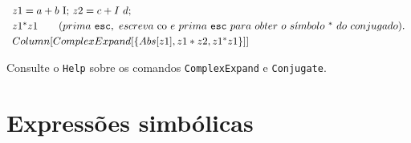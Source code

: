 \documentclass[11pt]{article}
\begin{document}
\begin{itemize}
\[\begin{array}{l}
z1 = a + b\ \textup{I}; \, z2 = c + I \ d;











\vspace{1mm}
\\

z1^{\ast} z1 \qquad (prima \ \texttt{esc}, \ escreva  \  {\rm co} \ e \  prima \  \texttt{esc} \ para \ obter \ o \ s\acute{\imath}mbolo \ ^\ast \  do \ conjugado). 

\vspace{1mm}
\\

Column[ComplexExpand[\{Abs[z1],
 z1\ast z2, 
z1^{\ast} z1\}]]





 \end{array}
\]


Consulte o \texttt{Help} sobre os comandos  \texttt{ComplexExpand} e  \texttt{Conjugate}.

  \end{itemize}

  
  \section{Express\~oes simb\' olicas}
  
\end{document}
